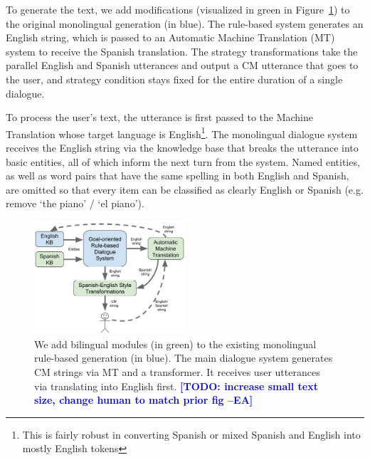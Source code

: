 \documentclass[11pt,a4paper]{article}
\newcommand{\ea}[1]{\textcolor{blue}{\bf\small [#1 --EA]}}
\newcommand{\Fref}[1]{Figure~\ref{#1}}
\begin{document}
To generate the text, we add modifications (visualized in green in \Fref{fig:sys-diagram}) to the original monolingual generation (in blue). 
The rule-based system generates an English string, which is passed to an Automatic Machine Translation (MT) system to receive the Spanish translation. 
The strategy transformations take the parallel English and Spanish utterances and output a CM utterance that goes to the user, and strategy condition stays fixed for the entire duration of a single dialogue.

To process the user's text, the utterance is first passed to the Machine Translation whose target language is English\footnote{This is fairly robust in converting Spanish or mixed Spanish and English into mostly English tokens}. 
The monolingual dialogue system receives the English string via the knowledge base that breaks the utterance into basic entities, all of which
inform the next turn from the system.
Named entities, as well as word pairs that have the same spelling in both English and Spanish, are omitted so that every item can be classified as clearly English or Spanish (e.g. remove `the piano' / `el piano').

\begin{figure}
	\includegraphics[width=0.5\textwidth]{img/all_system_1029}
	\centering
  	\caption{We add bilingual modules (in green) to the existing monolingual rule-based generation (in blue). The main dialogue system generates CM strings via MT and a transformer. It receives user utterances via translating into English first. \ea{TODO: increase small text size, change human to match prior fig}}
    \label{fig:sys-diagram}
\end{figure}
\end{document}
